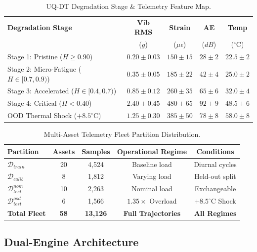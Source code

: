 \documentclass[journal,10pt,twocolumn]{article}
\begin{document}
\begin{table}[h]
\caption{UQ-DT Degradation Stage \& Telemetry Feature Map.}
\label{tab:telemetry}
\centering
\small
\begin{tabular}{lcccc}
\toprule
\textbf{Degradation Stage} & \textbf{Vib RMS} & \textbf{Strain} & \textbf{AE} & \textbf{Temp} \\
& ($g$) & ($\mu\epsilon$) & ($dB$) & ($^\circ\text{C}$) \\
\midrule
Stage 1: Pristine ($H \ge 0.90$) & $0.20 \pm 0.03$ & $150 \pm 15$ & $28 \pm 2$ & $22.5 \pm 2$ \\
Stage 2: Micro-Fatigue ($H \in [0.7, 0.9)$) & $0.35 \pm 0.05$ & $185 \pm 22$ & $42 \pm 4$ & $25.0 \pm 2$ \\
Stage 3: Accelerated ($H \in [0.4, 0.7)$) & $0.85 \pm 0.12$ & $260 \pm 35$ & $65 \pm 6$ & $32.0 \pm 4$ \\
Stage 4: Critical ($H < 0.40$) & $2.40 \pm 0.45$ & $480 \pm 65$ & $92 \pm 9$ & $48.5 \pm 6$ \\
OOD Thermal Shock ($+8.5^\circ\text{C}$) & $1.25 \pm 0.30$ & $385 \pm 50$ & $78 \pm 8$ & $58.0 \pm 8$ \\
\bottomrule
\end{tabular}
\end{table}

\begin{table}[h]
\caption{Multi-Asset Telemetry Fleet Partition Distribution.}
\label{tab:fleet}
\centering
\small
\begin{tabular}{lcccc}
\toprule
\textbf{Partition} & \textbf{Assets} & \textbf{Samples} & \textbf{Operational Regime} & \textbf{Conditions} \\
\midrule
$\mathcal{D}_{train}$ & 20 & 4,524 & Baseline load & Diurnal cycles \\
$\mathcal{D}_{calib}$ & 8 & 1,812 & Varying load & Held-out split \\
$\mathcal{D}_{test}^{nom}$ & 10 & 2,263 & Nominal load & Exchangeable \\
$\mathcal{D}_{test}^{ood}$ & 6 & 1,566 & $1.35\times$ Overload & $+8.5^\circ\text{C}$ Shock \\
\textbf{Total Fleet} & \textbf{58} & \textbf{13,126} & \textbf{Full Trajectories} & \textbf{All Regimes} \\
\bottomrule
\end{tabular}
\end{table}

\subsection{Dual-Engine Architecture}
\end{document}
